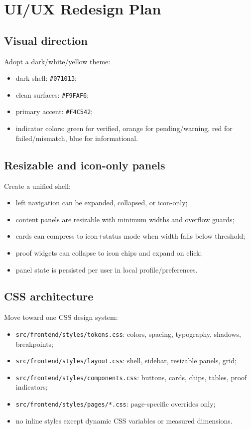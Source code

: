 \documentclass[11pt]{article}
\newcommand{\code}[1]{\texttt{#1}}
\begin{document}
\section{UI/UX Redesign Plan}

\subsection{Visual direction}
Adopt a dark/white/yellow theme:
\begin{itemize}
  \item dark shell: \code{\#071013};
  \item clean surfaces: \code{\#F9FAF6};
  \item primary accent: \code{\#F4C542};
  \item indicator colors: green for verified, orange for pending/warning, red for failed/mismatch, blue for informational.
\end{itemize}

\subsection{Resizable and icon-only panels}
Create a unified shell:
\begin{itemize}
  \item left navigation can be expanded, collapsed, or icon-only;
  \item content panels are resizable with minimum widths and overflow guards;
  \item cards can compress to icon+status mode when width falls below threshold;
  \item proof widgets can collapse to icon chips and expand on click;
  \item panel state is persisted per user in local profile/preferences.
\end{itemize}

\subsection{CSS architecture}
Move toward one CSS design system:
\begin{itemize}
  \item \code{src/frontend/styles/tokens.css}: colors, spacing, typography, shadows, breakpoints;
  \item \code{src/frontend/styles/layout.css}: shell, sidebar, resizable panels, grid;
  \item \code{src/frontend/styles/components.css}: buttons, cards, chips, tables, proof indicators;
  \item \code{src/frontend/styles/pages/*.css}: page-specific overrides only;
  \item no inline styles except dynamic CSS variables or measured dimensions.
\end{itemize}
\end{document}
